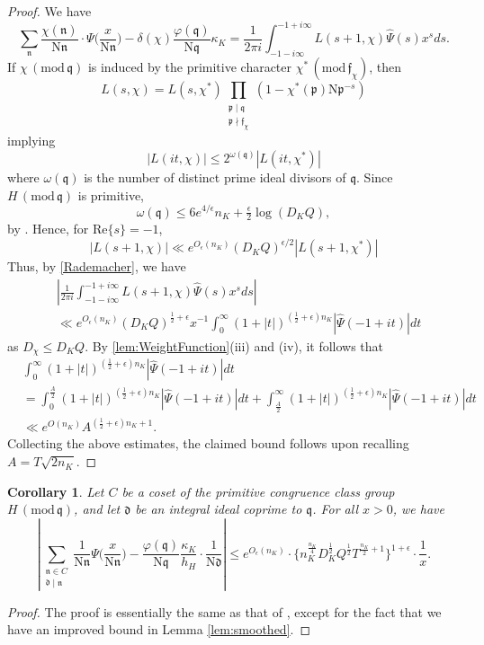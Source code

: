 \documentclass[12pt,psamsfonts]{amsart}
\newtheorem{cor}[thm]{Corollary}
\theoremstyle{definition}
\theoremstyle{remark}
\numberwithin{equation}{section}
\theoremstyle{plain}
\theoremstyle{remark}
\renewcommand{\1}{ {\bf 1}}
\newcommand{\kd}{\mathfrak{d}}
\renewcommand{\pmod}[1]{\, (\mathrm{mod} {\, #1})}
\newcommand{\kn}{\mathfrak{n}}
\newcommand{\N}{\mathrm{N}}
\newcommand{\kp}{\mathfrak{p}}
\newcommand{\kq}{\mathfrak{q}}
\renewcommand{\Re}{\mathrm{Re}}
\begin{document}
\begin{proof}
We have
\[
\sum_{\kn}\frac{\chi(\kn)}{\N\kn} \cdot \Psi\Big(\frac{x}{\N\kn}\Big)-\delta(\chi)\frac{\varphi(\kq)}{\N\kq}\kappa_K=\frac{1}{2\pi i}\int_{-1-i\infty}^{-1+i\infty}L(s+1,\chi)\widehat{\Psi}(s)x^s ds.
\]
If $\chi\pmod{\kq}$ is induced by the primitive character $\chi^* \pmod{\mathfrak{f}_{\chi}}$, then
\[
L(s,\chi)=L(s,\chi^*)\prod_{\substack{\kp\mid \kq \\ \kp\nmid\mathfrak{f}_{\chi}}}(1-\chi^*(\kp)\N\kp^{-s}) 
\]
implying 
\[
|L(it,\chi)|\leq 2^{\omega(\kq)}|L(it,\chi^*)|
\]
where $\omega(\kq)$ is the number of distinct prime ideal divisors of $\kq$. Since $H \pmod{\kq}$ is primitive,  
\[
\omega(\kq)\leq 6e^{4/\epsilon}n_K+\tfrac{\epsilon}{2} \log(D_K Q),
\]
by \cite[Lemma 1.13]{Weiss}. Hence, for $\Re\{s\} = -1$,
\[
|L(s+1,\chi)| \ll e^{O_{\epsilon}(n_K)} (D_K Q)^{\epsilon/2} |L(s+1,\chi^*)|
\]
Thus, by \cref{Rademacher}, we have 
\begin{align*}
&\left|\frac{1}{2\pi i}\int_{-1-i\infty}^{-1+i\infty}L(s+1, \chi )\widehat{\Psi}(s)x^s ds\right|\\
&\ll e^{O_{\epsilon}(n_K)} (D_K Q)^{\tfrac{1}{2}+\epsilon} x^{-1}\int_{0}^{\infty}(1+|t|)^{(\frac{1}{2}+\epsilon)n_K}|\widehat{\Psi}(-1+it)|dt
\end{align*}
as $D_{\chi} \leq D_K Q$. By \cref{lem:WeightFunction}(iii) and (iv), it follows that
\begin{align*}
&\int_{0}^{\infty}(1+|t|)^{(\frac{1}{2}+\epsilon)n_K}|\widehat{\Psi}(-1+it)|dt\\
&=\int_{0}^{\frac{A}{2}}(1+|t|)^{(\frac{1}{2}+\epsilon)n_K}|\widehat{\Psi}(-1+it)|dt+\int_{\frac{A}{2}}^{\infty}(1+|t|)^{(\frac{1}{2}+\epsilon)n_K}|\widehat{\Psi}(-1+it)|dt\\
&\ll e^{O(n_K)}A^{(\frac{1}{2}+\epsilon)n_K+1}.
\end{align*}
Collecting the above estimates, the claimed bound follows upon recalling $A = T\sqrt{2n_K}$. 
\end{proof}

\begin{cor}
Let $C$ be a coset of the primitive congruence class group $H\pmod{\kq}$, and let $\kd$ be an integral ideal coprime to $\kq$. For all $x > 0$, we have
\[
\left|\sum_{\substack{\kn\in C \\ \kd \mid\kn}}\frac{1}{\N\kn}\Psi\Big(\frac{x}{\N\kn}\Big)-\frac{\varphi(\kq)}{\N\kq}\frac{\kappa_K}{h_H} \cdot \frac{1}{\N\kd}\right|\leq e^{O_{{\epsilon}}(n_K)} \cdot \big\{ n_K^{\frac{n_K}{4}} D_K^{\tfrac{1}{2}} Q^{\tfrac{1}{2}} T^{\tfrac{n_K}{2}+1} \big\}^{1+\epsilon} \cdot \frac{1}{x}.
\]
\end{cor}
\begin{proof}
The proof is essentially the same as that of \cite[Corollary 3.5]{Weiss}, except for the fact that we have an improved bound in Lemma \ref{lem:smoothed}.
\end{proof}
\end{document}
